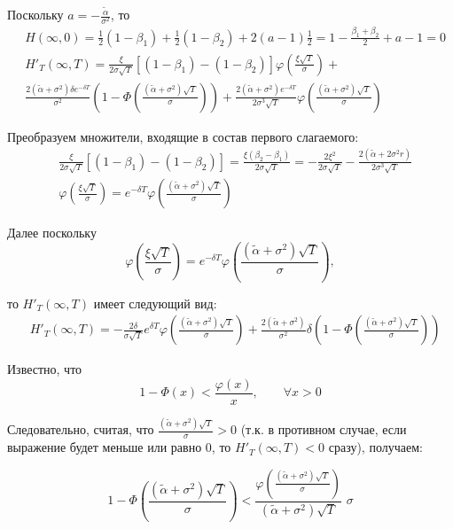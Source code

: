 \documentclass[oneside,final,12pt]{article}
\begin{document}
Поскольку $a=-\frac{\widetilde{\alpha}}{\sigma^2}$, то
\begin{align*}
    & H(\infty,0)=\frac{1}{2}(1-\beta_1)+\frac{1}{2}(1-\beta_2) +2(a-1)\frac{1}{2}=1-\frac{\beta_1+\beta_2}{2}+a-1=0 \\
    & H'_T(\infty,T)=\frac{\xi}{2\sigma\sqrt{T}}\left[(1-\beta_1)-(1-\beta_2)\right]\varphi\left(\frac{\xi\sqrt{T}}{\sigma}\right) + \\
    & \frac{2(\widetilde{\alpha}+\sigma^2)\delta e^{-\delta T}}{\sigma^2} \left( 1-\Phi\left(\frac{(\widetilde{\alpha}+\sigma^2)\sqrt{T}}{\sigma}\right)\right) + \frac{2(\widetilde{\alpha}+\sigma^2)e^{-\delta T}}{2\sigma^3\sqrt{T}} \varphi\left(\frac{(\widetilde{\alpha}+\sigma^2)\sqrt{T}}{\sigma}\right)
\end{align*}

Преобразуем множители, входящие в состав первого слагаемого:
\begin{align*}
    & \frac{\xi}{2\sigma\sqrt{T}}\left[(1-\beta_1)-(1-\beta_2)\right] = \frac{\xi(\beta_2-\beta_1)}{2\sigma\sqrt{T}} = -\frac{2\xi^2}{2\sigma\sqrt{T}} - \frac{2(\widetilde{\alpha}+2\sigma^2r)}{2\sigma^3\sqrt{T}} \\
    & \varphi\left(\frac{\xi\sqrt{T}}{\sigma}\right) = e^{-\delta T} \varphi\left(\frac{(\widetilde{\alpha}+\sigma^2)\sqrt{T}}{\sigma}\right)
\end{align*}

Далее поскольку
$$
\varphi\left(\frac{\xi\sqrt{T}}{\sigma}\right) = e^{-\delta T} \varphi\left(\frac{(\widetilde{\alpha}+\sigma^2)\sqrt{T}}{\sigma}\right),
$$

\noindent
то $H'_T(\infty,T)$ имеет следующий вид:
\begin{align*}
    & H'_T(\infty,T) = -\frac{2\delta}{\sigma\sqrt{T}} e^{\delta T} \varphi\left(\frac{(\widetilde{\alpha}+\sigma^2)\sqrt{T}}{\sigma}\right) + \frac{2(\widetilde{\alpha}+\sigma^2)}{\sigma^2}\delta \left(1-\Phi\left(\frac{(\widetilde{\alpha}+\sigma^2)\sqrt{T}}{\sigma}\right)\right) 
\end{align*}

Известно, что
$$ 1-\Phi(x) < \frac{\varphi(x)}{x}, \qquad \forall x>0$$

Следовательно, считая, что $\frac{(\widetilde{\alpha}+\sigma^2)\sqrt{T}}{\sigma}>0$ (т.к. в противном случае, если выражение будет меньше или равно 0, то $H'_T(\infty,T)<0$ сразу), получаем:

$$ 1-\Phi\left(\frac{(\widetilde{\alpha}+\sigma^2)\sqrt{T}}{\sigma}\right) < \frac{\varphi(\frac{(\widetilde{\alpha}+\sigma^2)\sqrt{T}}{\sigma})}{(\widetilde{\alpha}+\sigma^2)\sqrt{T}}\,\, \sigma$$
\end{document}
